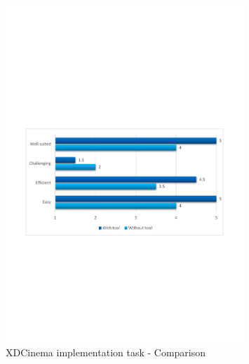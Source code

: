 \begin{figure}[H]
  \centering
    \includegraphics[width=0.8\textwidth]{images/charts/xdc_impl_comparison.pdf}
	\caption[xdc-impl: Comparison]{XDCinema implementation task - Comparison}
	\label{fig:xdc_impl_comparison}
\end{figure}

